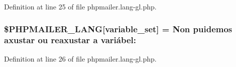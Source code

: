 Definition at line 25 of file phpmailer.\+lang-\/gl.\+php.

\subsubsection[{\texorpdfstring{\$\+P\+H\+P\+M\+A\+I\+L\+E\+R\+\_\+\+L\+A\+NG}{$PHPMAILER_LANG}}]{\setlength{\rightskip}{0pt plus 5cm}\$P\+H\+P\+M\+A\+I\+L\+E\+R\+\_\+\+L\+A\+NG\mbox{[}\textquotesingle{}variable\+\_\+set\textquotesingle{}\mbox{]} = \textquotesingle{}Non puidemos axustar ou reaxustar {\bf a} variábel\+: \textquotesingle{}}\hypertarget{phpmailer_8lang-gl_8php_af795debc7a739d038742691c358d9032}{}\label{phpmailer_8lang-gl_8php_af795debc7a739d038742691c358d9032}


Definition at line 26 of file phpmailer.\+lang-\/gl.\+php.

